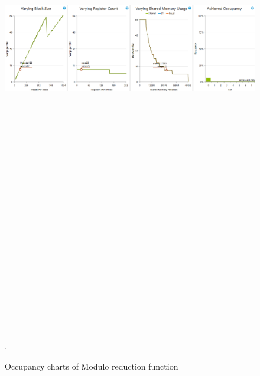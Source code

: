 \documentclass[oneside,openright,12pt,final,en]{mgr}
\begin{document}
\begin{figure}[H]
	\centering
	\includegraphics[width=\textwidth, height=26cm,keepaspectratio]{mod_occupancy_charts}.
	\caption{Occupancy charts of Modulo reduction function}
	\label{fig:mod_occupancy_charts}
\end{figure}
\end{document}
